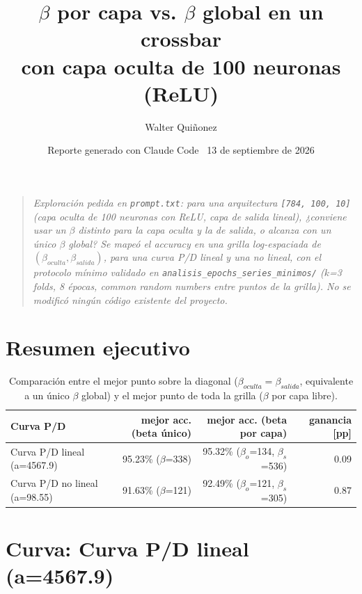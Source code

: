 \documentclass[11pt]{article}
\title{\textbf{$\beta$ por capa vs. $\beta$ global en un crossbar\\
con capa oculta de 100 neuronas (ReLU)}}
\author{Walter Quiñonez}
\date{Reporte generado con Claude Code \textperiodcentered\ 13 de septiembre de 2026}
\begin{document}
\maketitle

\begin{quote}\itshape
Exploración pedida en \texttt{prompt.txt}: para una arquitectura
\texttt{[784, 100, 10]} (capa oculta de 100 neuronas con ReLU, capa de
salida lineal), ¿conviene usar un $\beta$ distinto para la capa oculta y la
de salida, o alcanza con un único $\beta$ global? Se mapeó el accuracy en
una grilla log-espaciada de $(\beta_{oculta}, \beta_{salida})$, para una
curva P/D lineal y una no lineal, con el protocolo mínimo validado en
\texttt{analisis\_epochs\_series\_minimos/} ($k$=3 folds, 8 épocas,
\emph{common random numbers} entre puntos de la grilla). No se modificó
ningún código existente del proyecto.
\end{quote}

\tableofcontents


\section{Resumen ejecutivo}

\begin{table}[htbp]\centering

\begin{tabular}{@{}lrrr@{}}\toprule

Curva P/D & mejor acc. (beta único) & mejor acc. (beta por capa) & ganancia [pp] \\ \midrule

Curva P/D lineal (a=4567.9) & 95.23\% ($\beta$=338) & 95.32\% ($\beta_o$=134, $\beta_s$=536) & 0.09 \\

Curva P/D no lineal (a=98.55) & 91.63\% ($\beta$=121) & 92.49\% ($\beta_o$=121, $\beta_s$=305) & 0.87 \\

\bottomrule\end{tabular}

\caption{Comparación entre el mejor punto sobre la diagonal ($\beta_{oculta}=\beta_{salida}$, equivalente a un único $\beta$ global) y el mejor punto de toda la grilla ($\beta$ por capa libre).}

\end{table}

\section{Curva: Curva P/D lineal (a=4567.9)}
\end{document}
